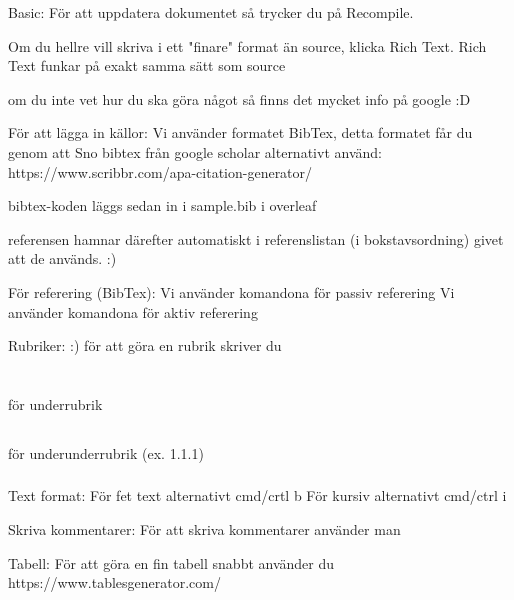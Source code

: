 Basic: 
    För att uppdatera dokumentet så trycker du på Recompile.

    Om du hellre vill skriva i ett "finare" format än source, klicka Rich Text. Rich Text funkar på exakt samma sätt som source
    
    om du inte vet hur du ska göra något så finns det mycket info på google :D 
    
För att lägga in källor:
    Vi använder formatet BibTex, detta formatet får du genom att Sno bibtex från google scholar alternativt använd: https://www.scribbr.com/apa-citation-generator/
    
    bibtex-koden läggs sedan in i sample.bib i overleaf
    
    referensen hamnar därefter automatiskt i referenslistan (i bokstavsordning) givet att de används. :)
    
För referering (BibTex): 
    Vi använder komandona \cite{} för passiv referering
    Vi använder komandona \citeA{} för aktiv referering
    
    
Rubriker: :) 
    för att göra en rubrik skriver du \section{}
    för underrubrik \subsection{}
    för underunderrubrik (ex. 1.1.1) \subsubsection{}

Text format: 
    För fet text \textbf{} alternativt cmd/crtl b
    För kursiv \textit{} alternativt cmd/ctrl i 
    
Skriva kommentarer: 
    För att skriva kommentarer använder man %
    
Tabell:
    För att göra en fin tabell snabbt använder du https://www.tablesgenerator.com/




